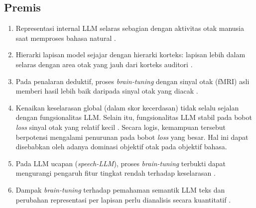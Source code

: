\subsection*{Premis}
\begin{enumerate}[label=P\arabic*.]
    \item Representasi internal LLM selaras sebagian dengan aktivitas otak manusia saat memproses bahasa natural \autocite{goldstein2022shared, schrimpf2021neural}.
    \item Hierarki lapisan model sejajar dengan hierarki korteks: lapisan lebih dalam selaras dengan area otak yang jauh dari korteks auditori \autocite{mischler2024contextual}.
    \item Pada penalaran deduktif, proses \textit{brain-tuning} dengan sinyal otak (fMRI) asli memberi hasil lebih baik daripada sinyal otak yang diacak \autocite{xiao2026beyond}.
    \item Kenaikan keselarasan global (dalam skor kecerdasan) tidak selalu sejalan dengan fungsionalitas LLM. Selain itu, fungsionalitas LLM stabil pada bobot \textit{loss} sinyal otak yang relatif kecil \autocite{xiao2026beyond}. Secara logis, kemampuan tersebut berpotensi mengalami penurunan pada bobot \textit{loss} yang besar. Hal ini dapat disebabkan oleh adanya dominasi objektif otak pada objektif bahasa.
    \item Pada LLM ucapan (\textit{speech-LLM}), proses \textit{brain-tuning} terbukti dapat mengurangi pengaruh fitur tingkat rendah terhadap keselarasan \autocite{moussa2025improving}.
    \item Dampak \textit{brain-tuning} terhadap pemahaman semantik LLM teks dan perubahan representasi per lapisan perlu dianalisis secara kuantitatif \autocite{negi2025brain}.
\end{enumerate}


